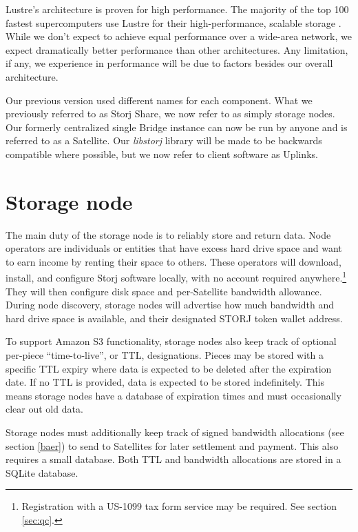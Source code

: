 \documentclass[8pt,fleqn,openany]{book}
\begin{document}
Lustre's architecture is proven for high performance. The majority of the top
100 fastest supercomputers use Lustre for their high-performance, scalable
storage \cite{lustre}. While we don't expect to achieve equal performance over
a wide-area network, we expect dramatically better performance than other
architectures. Any limitation, if any, we experience in performance will be
due to factors besides our overall architecture.

Our previous version used different names for each component. What we
previously referred to as Storj Share, we now refer to as simply storage nodes.
Our formerly centralized single Bridge instance can now be run by anyone and
is referred to as a Satellite.
Our {\em libstorj} library will be made to be backwards
compatible where possible, but we now refer to client software as
Uplinks.

\section{Storage node}\label{sec:concrete-storage-nodes}

The main duty of the storage node is to reliably store and return data.
Node operators
are individuals or entities that have excess hard drive space and want to earn
income by renting their space to others. These operators will
download,
install, and configure Storj software locally, with no account required
anywhere.\footnote{Registration with a US-1099 tax form service may be
required. See section \ref{sec:qc}.}
They will then configure disk space and per-Satellite bandwidth allowance.
During node discovery, storage nodes will advertise how much bandwidth and
hard drive space is available, and their designated STORJ token wallet address.

To support Amazon S3 functionality,
storage nodes also keep track of optional per-piece ``time-to-live'', or TTL,
designations.
Pieces may be stored with a specific TTL expiry where data is expected to
be deleted after the expiration date. If no TTL is provided, data is expected
to be stored indefinitely. This means storage nodes have a database of
expiration
times and must occasionally clear out old data.

Storage nodes must additionally keep track of signed bandwidth allocations
(see section \ref{baer}) to send to
Satellites for later settlement and payment. This also requires a small
database. Both TTL and bandwidth allocations are stored in a SQLite
\cite{sqlite} database.
\end{document}

